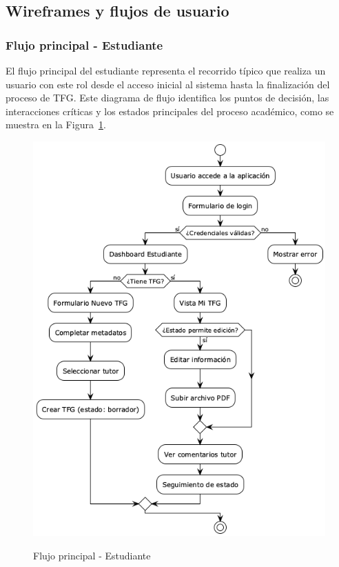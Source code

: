\documentclass[12pt,a4paper,oneside]{report}
\providecommand{\pandocbounded}[1]{#1}
\begin{document}
\subsection{Wireframes y flujos de
usuario}\label{wireframes-y-flujos-de-usuario}

\subsubsection{Flujo principal -
Estudiante}\label{flujo-principal---estudiante}

El flujo principal del estudiante representa el recorrido típico que realiza un usuario con este rol desde el acceso inicial al sistema hasta la finalización del proceso de TFG. Este diagrama de flujo identifica los puntos de decisión, las interacciones críticas y los estados principales del proceso académico, como se muestra en la Figura~\ref{fig:flujo-principal-estudiante}.

\begin{figure}[H]
\centering
\pandocbounded{\includegraphics[keepaspectratio,alt={Flujo principal - Estudiante}]{processed/images/05_diseno_plantuml_4.png}}
\caption{Flujo principal - Estudiante}
\label{fig:flujo-principal-estudiante}
\end{figure}
\end{document}
